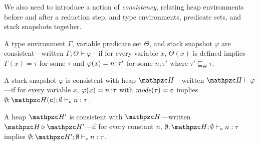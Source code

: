 We also need to introduce a notion of
\emph{consistency}, relating heap environments before and after a
reduction step, and type environments, predicate sets, and stack
snapshots together.


\begin{defi}
A type environment $\Gamma$, variable predicate set $\Theta$, and
stack snapshot $\varphi$ are consistent---written $\Gamma;\Theta\vdash
\varphi$---if for every variable $x$, $\Theta(x)$ is defined implies
$\Gamma(x) = \tau$ for some $\tau$ and 
$\varphi(x) ={n}\!:\!{\tau'}$ for some $n,\tau'$ where $\tau' \sqsubseteq_{\Theta} \tau$. 
\end{defi}

\begin{defi}
A stack snapshot $\varphi$ is consistent with heap $\heap$---written $\heap \vdash \varphi$---if
for every variable $x$, $\varphi(x)= {n}\!:\!{\tau}$ with $\textit{mode}(\tau)=\texttt{c}$ implies $\emptyset;\heap(\cmode);\emptyset \vdash_{\cmode} n:\tau$.
\end{defi}

\begin{defi}
A heap $\heap'$ is consistent with $\heap$---written $\heap \triangleright \heap'$---if
for every constant $n$, $\emptyset;\heap;\emptyset \vdash_{\cmode} n:\tau$ implies $\emptyset;\heap';\emptyset \vdash_{\cmode} n:\tau$.
\end{defi}



